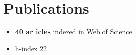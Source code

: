 \hypertarget{publications}{%
\section{Publications}\label{publications}}

\begin{callout}

\begin{itemize}
\tightlist
\item
  \textbf{40 articles} indexed in Web of Science
\item
  h-index 22
\end{itemize}

\end{callout}
